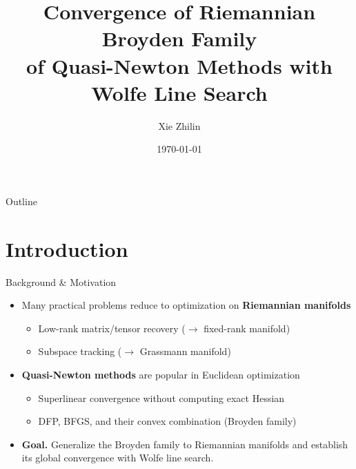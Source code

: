 \documentclass[10pt,aspectratio=169]{beamer}
\title[Riemannian Broyden Family]{Convergence of Riemannian Broyden Family \\of Quasi-Newton Methods with Wolfe Line Search}
\author{Xie Zhilin}
\institute{}
\date{\today}
\begin{document}
\begin{frame}
\titlepage
\end{frame}

\begin{frame}{Outline}
\tableofcontents
\end{frame}

\section{Introduction}

\begin{frame}{Background \& Motivation}
\begin{itemize}
    \item Many practical problems reduce to optimization on \textbf{Riemannian manifolds}
    \begin{itemize}
        \item Low-rank matrix/tensor recovery ($\to$ fixed-rank manifold)
        \item Subspace tracking ($\to$ Grassmann manifold)
    \end{itemize}
    \bigskip
    \item \textbf{Quasi-Newton methods} are popular in Euclidean optimization
    \begin{itemize}
        \item Superlinear convergence without computing exact Hessian
        \item DFP, BFGS, and their convex combination (Broyden family)
    \end{itemize}
    \bigskip
    \item \textbf{Goal.} Generalize the Broyden family to Riemannian manifolds and establish its global convergence with Wolfe line search.
\end{itemize}
\end{frame}
\end{document}
